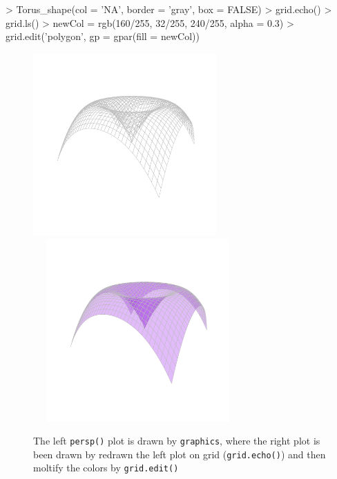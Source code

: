 \documentclass[paper=a4, fontsize=11pt]{report}
\begin{document}
\begin{Schunk}
\begin{Sinput}
> Torus_shape(col = 'NA', border = 'gray', box = FALSE)
> grid.echo()
> grid.ls()
> newCol = rgb(160/255, 32/255, 240/255, alpha = 0.3)
> grid.edit('polygon', gp = gpar(fill = newCol))
\end{Sinput}
\end{Schunk}

\begin{figure}[h]
	\begin{center}
		\includegraphics[height = 7cm, width = 7cm]{figure/Chapter6_example_1_2.pdf}
		\includegraphics[height = 7cm, width = 8cm]{figure/Chapter6_example_1_3.pdf}
		\caption{The left \texttt{persp()} plot is drawn by \texttt{graphics}, where the right plot is been drawn by redrawn the left plot on grid (\texttt{grid.echo()}) and then moltify the colors by \texttt{grid.edit()}}
		\label{Example_6.3}
	\end{center}
\end{figure}
\end{document}
